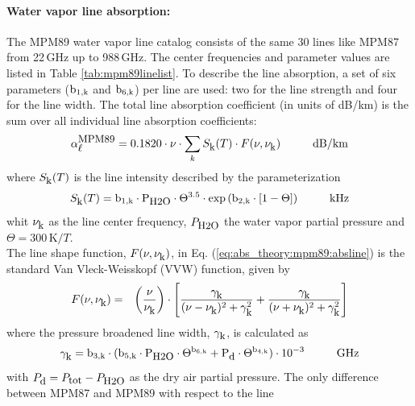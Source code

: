 \paragraph{Water vapor line absorption:}
\label{levele:mpm89_h2olines}
The MPM89 water vapor line catalog consists of the same 30 lines 
like MPM87 from 22\,GHz up to 988\,GHz. The center frequencies and parameter 
values are listed in Table \ref{tab:mpm89linelist}. To describe the line 
absorption, a set of six parameters ($\rm b_{\rm 1,k}$ and $\rm b_{\rm 6,k}$) per line are used: two 
for the line strength and four for the line width. The total line 
absorption coefficient (in units of dB/km) is the sum over all
individual line absorption coefficients:
\begin{equation}
  \label{eq:abs_theory:mpm89:absline}
  \alphampmml = 0.1820 \cdot \nu \cdot
  \sum_{k}{\inten \cdot \shape}\hspace*{10mm}\mbox{dB/km}
\end{equation}
where $S_{\mbox{\rm \small k}}(T)$ is the line intensity described by the parameterization
\begin{equation}
  \label{eq:abs_theory:mpm89:strength}
  \inten = \bek \cdot \phzo \cdot \Theta^{3.5} 
           \cdot \exp{(\bzk \cdot [1-\Theta])}\hspace*{10mm}\mbox{kHz}
\end{equation}
whit $\nu_{\mbox{\rm \small k}}$ as the line center frequency, $P_{\mbox{\rm \small H2O}}$ the water
vapor partial pressure and $\Theta = 300\,\mbox{K}/T$.\\
The line shape function, $F(\nu,\nu_{\mbox{\rm \small k}})$, in Eq. (\ref{eq:abs_theory:mpm89:absline}) 
is the standard Van Vleck-Weisskopf (VVW) function, given by 
\begin{eqnarray}
  \label{eq:abs_theory:mpm89:VVW}
  F(\nu,\nu_{\mbox{\rm \small k}}) & = & \left(\frac{\nu}{\nu_{\mbox{\rm \small k}}}\right) \cdot 
               \left[\frac{\gamma_{\mbox{\rm \small k}}}{(\nu - \nu_{\mbox{\rm \small k}})^2 + \gamma_{\mbox{\rm \small k}}^2} + 
                     \frac{\gamma_{\mbox{\rm \small k}}}{(\nu + \nu_{\mbox{\rm \small k}})^2 + \gamma_{\mbox{\rm \small k}}^2}\right]
\end{eqnarray}
where the pressure broadened line width, $\gamma_{\mbox{\rm \small k}}$, is calculated as
\begin{equation}
  \label{eq:abs_theory:mpm89:gamma}
  \gamk = \bdk \cdot 
         (\bfk \cdot \phzo \cdot \Theta^{\bsk} + 
                     \pda  \cdot \Theta^{\bvk})
        \cdot 10^{-3}\hspace*{10mm}\mbox{GHz}
\end{equation}
with $P_{\mbox{\rm \small d}}=P_{\mbox{\rm \small tot}}-P_{\mbox{\rm \small H2O}}$ as the dry air partial pressure. 
The only difference between MPM87 and MPM89 with respect to the line 
